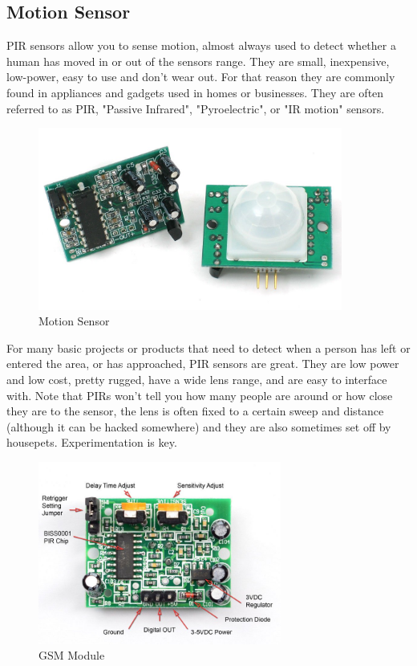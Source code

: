 \documentclass[twoside,a4paper,16pt]{book}
\begin{document}
{\subsection{Motion Sensor }
PIR sensors allow you to sense motion, almost always used to detect whether a human has moved in or out of the sensors range. They are small, inexpensive, low-power, easy to use and don't wear out. For that reason they are commonly found in appliances and gadgets used in homes or businesses. They are often referred to as PIR, "Passive Infrared", "Pyroelectric", or "IR motion" sensors.
\begin{figure}[ht!]
	\begin{center}
		\includegraphics[width=10.0cm]{13.jpg}
		\caption{Motion Sensor}
	\end{center}
\end{figure}
For many basic projects or products that need to detect when a person has left or entered the area, or has approached, PIR sensors are great. They are low power and low cost, pretty rugged, have a wide lens range, and are easy to interface with. Note that PIRs won't tell you how many people are around or how close they are to the sensor, the lens is often fixed to a certain sweep and distance (although it can be hacked somewhere) and they are also sometimes set off by housepets. Experimentation is key.
\begin{figure}[ht!]
	\begin{center}
		\includegraphics[width=8.0cm]{14.jpg}
		\caption{GSM Module}
	\end{center}
\end{figure}
}
\end{document}
